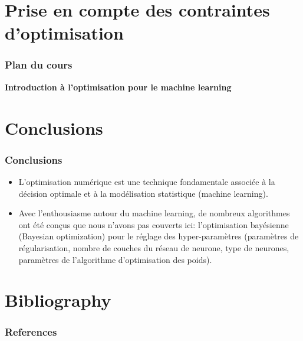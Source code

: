 \documentclass[12pt]{beamer}
\begin{document}
\section{Prise en compte des contraintes d'optimisation}
\begin{frame}%
\frametitle{Plan du cours} 
\begin{center} \textbf{Introduction à l'optimisation pour le machine learning} \end{center}
\tableofcontents[currentsection]
\end{frame}

\section{Conclusions}

\begin{frame}
\frametitle{Conclusions}
\begin{itemize}
\item L'optimisation numérique est une technique fondamentale associée à la décision optimale et à la modélisation statistique (machine learning).
\item Avec l'enthousiasme autour du machine learning, de nombreux algorithmes ont été conçus que nous n'avons pas couverts ici: l'optimisation bayésienne (Bayesian optimization) pour le réglage des hyper-paramètres (paramètres de régularisation, nombre de couches du réseau de neurone, type de neurones, paramètres de l'algorithme d'optimisation des poids).
\end{itemize}
\end{frame}

\section{Bibliography}

\begin{frame}[allowframebreaks]
\frametitle{References}
\scriptsize
%   
   
   
\end{frame}
\end{document}
